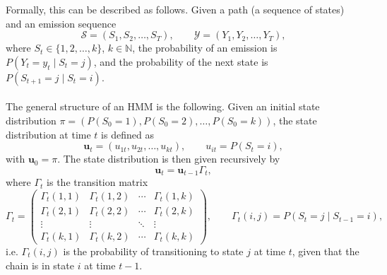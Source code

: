 Formally, this can be described as follows. Given a path (a sequence of states) and an emission sequence
\begin{equation*}
    \mathcal{S} = (S_1, S_2, \dots, S_T), \qquad \mathcal{Y} = (Y_1, Y_2, \dots, Y_T),
\end{equation*}
where $S_t \in \{1, 2, \dots, k\}$, $k \in \mathbb{N}$, the probability of an emission is
$P(Y_t = y_t \mid S_t = j)$, and the probability of the next state is $P(S_{t+1} = j \mid S_t = i)$.\\
\\
The general structure of an HMM is the following.
Given an initial state distribution
$\pi=(P(S_0 = 1), P(S_0 = 2), \dots, P(S_0 = k))$, the state distribution at time $t$ is defined as
\begin{equation*}
    \mathbf{u}_t = (u_{1t}, u_{2t}, \dots, u_{kt}), \qquad u_{it} = P(S_t = i),
\end{equation*}
with $\mathbf{u}_0 = \pi$. The state distribution is then given recursively by
\begin{equation}
    \mathbf{u}_t = \mathbf{u}_{t-1} \Gamma_t,
\end{equation}
where $\Gamma_t$ is the transition matrix
\begin{equation*}
    \Gamma_t =
    \begin{pmatrix}
        \Gamma_t(1, 1) & \Gamma_t(1, 2) & \cdots & \Gamma_t(1, k) \\
        \Gamma_t(2, 1) & \Gamma_t(2, 2) & \cdots & \Gamma_t(2, k) \\
        \vdots         & \vdots         & \ddots & \vdots         \\
        \Gamma_t(k, 1) & \Gamma_t(k, 2) & \cdots & \Gamma_t(k, k)
    \end{pmatrix},
    \qquad
    \Gamma_t(i, j) = P(S_t = j \mid S_{t-1} = i),
\end{equation*}
i.e. $\Gamma_t(i, j)$ is the probability of transitioning to state $j$ at time $t$, given that the chain is in state $i$ at time $t-1$.

